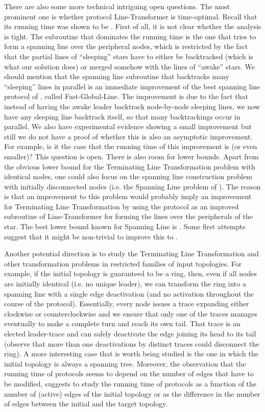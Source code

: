 \documentclass[preprint]{elsarticle}
\begin{document}
There are also some more technical intriguing open questions. The most prominent one is whether protocol Line-Transformer is time-optimal. Recall that its running time was shown to be . First of all, it is not clear whether the analysis is tight. The subroutine that dominates the running time is the one that tries to form a spanning line over the peripheral nodes, which is restricted by the fact that the partial lines of ``sleeping'' stars have to either be backtracked (which is what our solution does) or merged somehow with the lines of ``awake'' stars. We should mention that the spanning line subroutine that backtracks many ``sleeping'' lines in parallel is an immediate improvement of the best spanning line protocol of \cite{MS14}, called Fast-Global-Line. The improvement is due to the fact that instead of having the awake leader backtrack node-by-node sleeping lines, we now have any sleeping line backtrack itself, so that many backtrackings occur in parallel. We also have experimental evidence showing a small improvement \cite{ALMS15} but still we do not have a proof of whether this is also an asymptotic improvement. For example, is it the case that the running time of this improvement is  (or even smaller)? This question is open. There is also room for lower bounds. Apart from the obvious lower bound for the Terminating Line Transformation problem with identical nodes, one could also focus on the spanning line construction problem with initially disconnected nodes (i.e. the Spanning Line problem of \cite{MS14}). The reason is that an improvement to this problem would probably imply an improvement for Terminating Line Transformation by using the protocol as an improved subroutine of Line-Transformer for forming the lines over the peripherals of the star. The best lower bound known for Spanning Line is . Some first attempts suggest that it might be non-trivial to improve this to . 

Another potential direction is to study the Terminating Line Transformation and other transformation problems in restricted families of input topologies. For example, if the initial topology is guaranteed to be a ring, then, even if all nodes are initially identical (i.e. no unique leader), we can transform the ring into a spanning line with a single edge deactivation (and no activation throughout the course of the protocol). Essentially, every node issues a trace expanding either clockwise or counterclockwise and we ensure that only one of the traces manages eventually to make a complete turn and reach its own tail. That trace is an elected leader-trace and can safely deactivate the edge joining its head to its tail (observe that more than one deactivations by distinct traces could disconnect the ring). A more interesting case that is worth being studied is the one in which the initial topology is always a spanning tree. Moreover, the observation that the running time of protocols seems to depend on the number of edges that have to be modified, suggests to study the running time of protocols as a function of the number of (active) edges of the initial topology or as the difference in the number of edges between the initial and the target topology.
\end{document}
